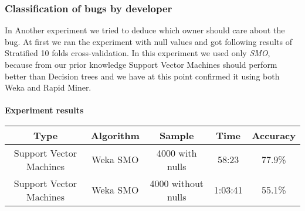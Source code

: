 \subsubsection*{Classification of bugs by developer} %
\label{sub:Classification of bugs bugs by developer}
    In Another experiment we tried to deduce which owner should care about the bug.
    At first we ran the experiment with null values and got following results of Stratified 10 folds cross-validation.
    In this experiment we used only {\it SMO}, because from our prior knowledge Support Vector Machines
    should perform better than Decision trees and we have at this point confirmed it using both Weka and Rapid Miner.
\\
\\
{\bf Experiment results}
\\
\begin{tabular}{|c|c|c|c|c|}
\hline
Type     &       Algorithm   & Sample &  Time &  Accuracy   \\
\hline
\hline
Support Vector Machines   & Weka SMO    & 4000  with nulls &   58:23 &    77.9\%  \\
Support Vector Machines   & Weka SMO    & 4000  without nulls &  1:03:41 &    55.1\%  \\
\hline
\end{tabular}
\\
\\



